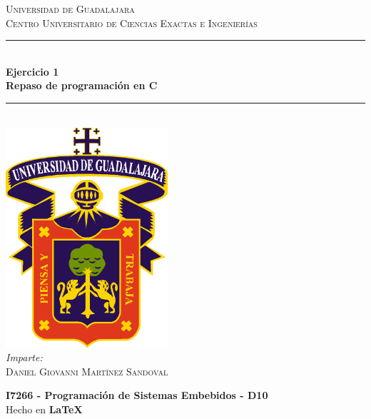 \documentclass[10pt,letterpaper]{article}
\newcommand{\HRule}{\rule{\linewidth}{0.5mm}} %
\begin{document}

\begin{titlepage}
    \center
    
    \textsc{\LARGE Universidad de Guadalajara}\\[0.2cm] %
    \textsc{Centro Universitario de Ciencias Exactas e Ingenierías}\\[1cm]
    
    \HRule \\[0.3cm]
    { 
        \LARGE \textbf{Ejercicio 1} \\[0.3cm]
        \large \textbf{Repaso de programación en C} \\[0.3cm]
    }
    \HRule \\[2cm]
    
    \includegraphics[width=6cm]{logo_udg_color.eps}\\[1.25cm] %
    
    \center
    \vspace{1cm}
    \emph{Imparte:} \\ %
    \textsc{Daniel Giovanni Martínez Sandoval} 
    
    \vfill
    \textbf{I7266 - Programación de Sistemas Embebidos - D10} \\
    Hecho en \textbf{\LaTeX}	
\end{titlepage}




\end{document}
